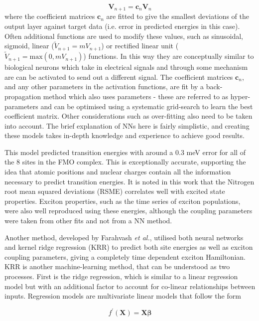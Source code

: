 \begin{equation}
	\mathbf{V}_{n+1} = \mathbf{c}_n \mathbf{V}_n	
\end{equation}
%
where the coefficient matrices $\mathbf{c}_n$ are fitted to give the smallest deviations
of the output layer against target data (i.e. error in predicted \Qy energies in 
this case). Often additional functions are used to modify these values, such as
sinusoidal, sigmoid, linear ($\tilde{V}_{n+1}=m V_{n+1}$) or rectified linear unit 
($\tilde{V}_{n+1}=\text{max}\left(0, m V_{n+1} \right)$) functions. In this way they 
are conceptually similar to biological neurons which take in electrical signals 
and through some mechanism are can be activated to send out a different signal. 
The coefficient matrices $\mathbf{c}_n$, and any other parameters in the activation
functions, are fit by a back-propagation method which also uses parameters - these 
are referred to as hyper-parameters and can be optimised using a systematic grid-search
to learn the best coefficient matrix. Other considerations such as over-fitting 
also need to be taken into account. The brief explanation of NNs here is fairly 
simplistic, and creating these models takes in-depth knowledge and experience to
achieve good results.

This model predicted \Qy transition energies with around a 0.3 meV error for all
of the 8 sites in the FMO complex. This is exceptionally accurate, supporting the
idea that atomic positions and nuclear charges contain all the information necessary
to predict transition energies. It is noted in this work that the Nitrogen root
mean squared deviations (RSME) correlates well with excited state properties. Exciton
properties, such as the time series of exciton populations, were also well reproduced
using these \Qy energies, although the coupling parameters were taken from other
fits and not from a NN method.

Another method, developed by Farahvash \emph{et al.}, utilised both neural networks
and kernel ridge regression (KRR) to predict both site energies as well as exciton 
coupling parameters, giving a completely time dependent exciton Hamiltonian. KRR
is another machine-learning method, that can be understood as two processes. First
is the ridge regression, which is similar to a linear regression model but with
an additional factor to account for co-linear relationships between inputs. Regression
models are multivariate linear models that follow the form

\begin{equation}
	f^\prime\left(\mathbf{X}\right) = \mathbf{X} \mathbf{\beta}
\end{equation}

